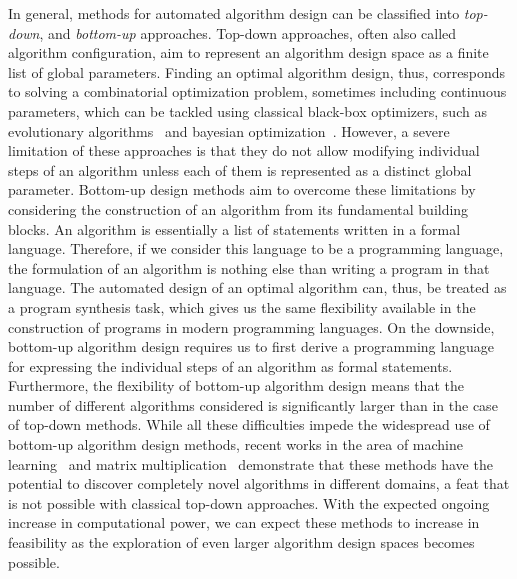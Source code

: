 In general, methods for automated algorithm design can be classified into \emph{top-down}, and \emph{bottom-up} approaches.
Top-down approaches, often also called algorithm configuration, aim to represent an algorithm design space as a finite list of global parameters.
Finding an optimal algorithm design, thus, corresponds to solving a combinatorial optimization problem, sometimes including continuous parameters, which can be tackled using classical black-box optimizers, such as evolutionary algorithms~\cite{back1996evolutionary} and bayesian optimization~\cite{frazier2018tutorial}.
However, a severe limitation of these approaches is that they do not allow modifying individual steps of an algorithm unless each of them is represented as a distinct global parameter.
Bottom-up design methods aim to overcome these limitations by considering the construction of an algorithm from its fundamental building blocks.
An algorithm is essentially a list of statements written in a formal language.
Therefore, if we consider this language to be a programming language, the formulation of an algorithm is nothing else than writing a program in that language.
The automated design of an optimal algorithm can, thus, be treated as a program synthesis task, which gives us the same flexibility available in the construction of programs in modern programming languages.
On the downside, bottom-up algorithm design requires us to first derive a programming language for expressing the individual steps of an algorithm as formal statements.
Furthermore, the flexibility of bottom-up algorithm design means that the number of different algorithms considered is significantly larger than in the case of top-down methods.
While all these difficulties impede the widespread use of bottom-up algorithm design methods, recent works in the area of machine learning~\cite{real2020automl,co2021evolving} and matrix multiplication~\cite{fawzi2022discovering} demonstrate that these methods have the potential to discover completely novel algorithms in different domains, a feat that is not possible with classical top-down approaches.
With the expected ongoing increase in computational power, we can expect these methods to increase in feasibility as the exploration of even larger algorithm design spaces becomes possible.

